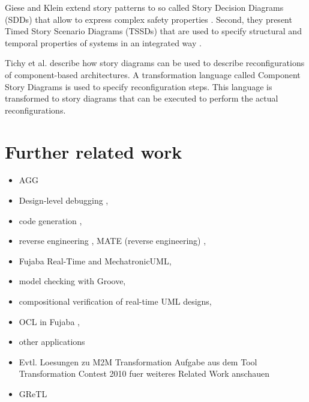 Giese and Klein extend story patterns to so called Story Decision Diagrams (SDDs) that allow to express complex safety properties \cite{GK06a} .
Second, they present Timed Story Scenario Diagrams (TSSDs) that are used to specify structural and temporal properties of systems in an integrated way \cite{KG07a}.

Tichy et al. \cite{THH+08} describe how story diagrams can be used to describe reconfigurations of component-based architectures.
A transformation language called Component Story Diagrams is used to specify reconfiguration steps.
This language is transformed to story diagrams that can be executed to perform the actual reconfigurations.

\section*{Further related work}

\begin{itemize}
\item AGG
\item Design-level debugging \cite{GZ02,Gei02,GZ06},
\item code generation \cite{GSR05,GBD07},
\item reverse engineering \cite{NSW+02,BGS+Z08}, MATE (reverse engineering) \cite{SKS+07,ST08},
\item Fujaba Real-Time and MechatronicUML,
\item model checking with Groove,
\item compositional verification of real-time UML designs,
\item OCL in Fujaba \cite{SZG07},
\item other applications \cite{KNNZ00,GZ10}
 \item Evtl. Loesungen zu M2M Transformation Aufgabe aus dem Tool Transformation Contest 2010 fuer weiteres Related Work anschauen
 \item GReTL \cite{HE11}
\end{itemize}

